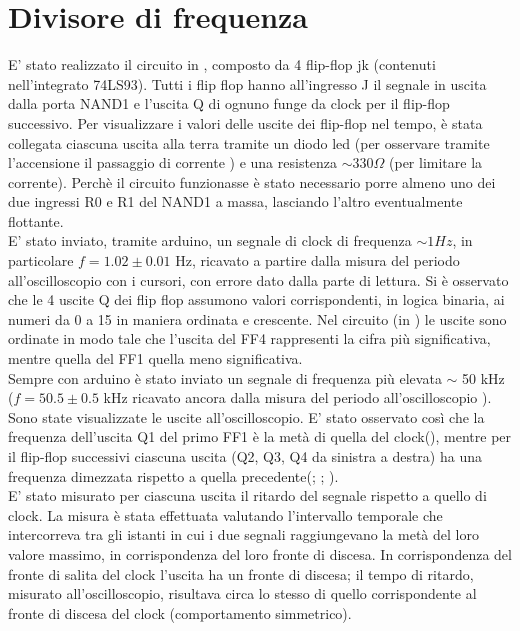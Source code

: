 \section{Divisore di frequenza}
E' stato realizzato il circuito in , composto da 4 flip-flop jk (contenuti nell'integrato 74LS93). Tutti i flip flop hanno all'ingresso J il segnale in uscita dalla porta NAND1 e l'uscita Q di ognuno funge da clock per il flip-flop successivo.
Per visualizzare i valori delle uscite dei flip-flop nel tempo, è stata collegata ciascuna uscita alla terra tramite un diodo led (per osservare tramite l'accensione il passaggio di corrente ) e una resistenza $\sim 330 \Omega$ (per limitare la corrente). Perchè il circuito funzionasse è stato necessario porre almeno uno dei due ingressi R0 e R1 del NAND1 a massa, lasciando l'altro eventualmente flottante.\\
E' stato inviato, tramite arduino, un segnale di clock di frequenza $\sim 1 Hz$, in particolare $f = 1.02 \pm 0.01$ Hz, ricavato a partire dalla misura del periodo all'oscilloscopio con i cursori, con errore dato dalla parte di lettura. Si è osservato che le 4 uscite Q dei flip flop assumono valori corrispondenti, in logica binaria, ai numeri da 0 a 15 in maniera ordinata e crescente. Nel circuito (in  ) le uscite sono ordinate in modo tale che l'uscita del FF4 rappresenti la cifra più significativa, mentre  quella del FF1 quella meno significativa.\\
Sempre con arduino è stato inviato un segnale di frequenza più elevata $\sim$ 50 kHz ($f = 50.5 \pm 0.5$ kHz ricavato ancora dalla misura del periodo all'oscilloscopio ). Sono state visualizzate le uscite all'oscilloscopio. E' stato osservato così che la frequenza dell'uscita Q1 del primo FF1 è la metà di quella del clock(), mentre per il flip-flop successivi ciascuna uscita (Q2, Q3, Q4 da sinistra a destra) ha una frequenza dimezzata rispetto a quella precedente(; ; ).\\
E' stato misurato per ciascuna uscita il ritardo del segnale rispetto a quello di clock. La misura è stata effettuata valutando l'intervallo temporale che intercorreva tra gli istanti in cui i due segnali raggiungevano la metà del loro valore massimo, in corrispondenza del loro fronte di discesa. In corrispondenza del fronte di salita del clock l'uscita ha un fronte di discesa; il tempo di ritardo, misurato all'oscilloscopio, risultava circa lo stesso di quello corrispondente al fronte di discesa del clock (comportamento simmetrico).\\

